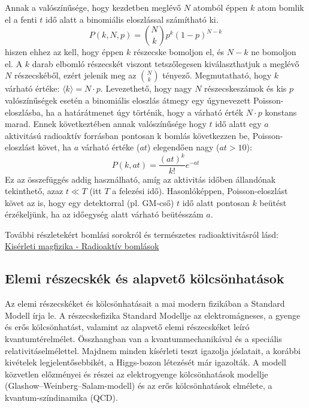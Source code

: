 \documentclass[../main.tex]{subfiles}
\begin{document}
Annak a valószínűsége, hogy kezdetben meglévő $N$ atomból éppen $k$ atom bomlik el
a fenti $t$ idő alatt a binomiális eloszlással számítható ki.
\begin{equation}
    P(k, N, p) = \binom{N}{k} p^k (1 - p)^{N-k}
\end{equation}
hiszen ehhez az kell, hogy éppen $k$ részecske bomoljon el, és $N - k$ ne bomoljon el. A $k$
darab elbomló részecskét viszont tetszőlegesen kiválaszthatjuk a meglévő $N$ részecskéből,
ezért jelenik meg az $\binom{N}{k}$ tényező. Megmutatható, hogy $k$ várható értéke: $\langle k \rangle = N \cdot p$.
Levezethető, hogy nagy $N$ részecskeszámok és kis $p$ valószínűségek esetén a binomiális
eloszlás átmegy egy úgynevezett Poisson-eloszlásba, ha a határátmenet úgy történik,
hogy a várható érték $N \cdot p$ konstans marad. Ennek következtében annak valószínűsége
hogy $t$ idő alatt egy $a$ aktivitású radioaktív forrásban pontosan k bomlás következzen
be, Poisson-eloszlást követ, ha $a$ várható értéke ($a t$) elegendően nagy ($a t > 10$):
\begin{equation}
    P(k, a t) = \frac{(a t)^k}{k!} e^{-a t}
\end{equation}
Ez az összefüggés addig használható, amíg az aktivitás időben állandónak tekinthető,
azaz $t \ll T$ (itt $T$ a felezési idő). Hasonlóképpen, Poisson-eloszlást követ az is, hogy
egy detektorral (pl. GM-cső) $t$ idő alatt pontosan $k$ beütést érzékeljünk, ha az időegység
alatt várható beütésszám $a$. 

További részletekért bomlási sorokról és természetes radioaktivitásról lásd: \href{https://mek.oszk.hu/16000/16052/16052.pdf#section.3.3}{Kisérleti magfizika - Radioaktív bomlások}

\subsection{Elemi részecskék és alapvető kölcsönhatások \cite{kiserleti_atomfizika}}
Az elemi részecskéket és kölcsönhatásait a mai modern fizikában a Standard Modell írja le. A részecskefizika Standard Modellje az elektromágneses, a gyenge és erős kölcsönhatást,
valamint az alapvető elemi részecskéket leíró kvantumtérelmélet. Összhangban van a kvantummechanikával és a speciális relativitáselmélettel.
Majdnem minden kísérleti teszt igazolja jóslatait, a korábbi kivételek legjelentősebbikét, a Higgs-bozon létezését már igazolták. A modell közvetlen előzményei és részei az elektrogyenge kölcsönhatások modellje
(Glashow–Weinberg–Salam-modell) és az erős kölcsönhatások elmélete, a kvantum-színdinamika (QCD).
\end{document}
